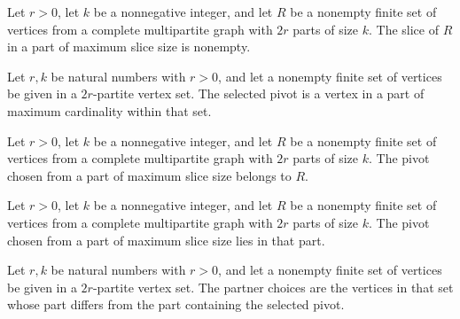 \begin{theorem}
\label{FABL.greedyLargestPartSlice_nonempty}
\leanok
{}
Let $r>0$, let $k$ be a nonnegative integer, and let $R$ be a nonempty finite set of
vertices from a complete multipartite graph with $2r$ parts of size $k$. The slice of
$R$ in a part of maximum slice size is nonempty.
\end{theorem}

\begin{definition}
\label{FABL.greedyPivot}
\leanok
{}
Let $r,k$ be natural numbers with $r>0$, and let a nonempty finite set of vertices be
given in a $2r$-partite vertex set. The selected pivot is a vertex in a part of maximum
cardinality within that set.
\end{definition}

\begin{theorem}
\label{FABL.greedyPivot_mem}
\leanok
{}
Let $r>0$, let $k$ be a nonnegative integer, and let $R$ be a nonempty finite set of
vertices from a complete multipartite graph with $2r$ parts of size $k$. The pivot
chosen from a part of maximum slice size belongs to $R$.
\end{theorem}

\begin{theorem}
\label{FABL.greedyPivot_part}
\leanok
{}
Let $r>0$, let $k$ be a nonnegative integer, and let $R$ be a nonempty finite set of
vertices from a complete multipartite graph with $2r$ parts of size $k$. The pivot
chosen from a part of maximum slice size lies in that part.
\end{theorem}

\begin{definition}
\label{FABL.greedyPartnerChoices}
\leanok
{}
Let $r,k$ be natural numbers with $r>0$, and let a nonempty finite set of vertices be
given in a $2r$-partite vertex set. The partner choices are the vertices in that set
whose part differs from the part containing the selected pivot.
\end{definition}

